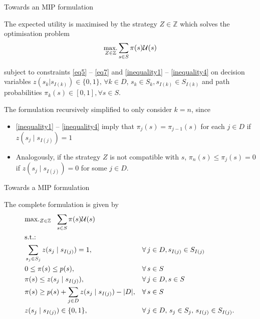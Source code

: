 \documentclass[mathserif,aspectratio=149]{beamer}
\begin{document}
\begin{frame}{Towards an MIP formulation}

\vspace{6pt}

\begin{corollary}\label{cor:opt1}
	The expected utility is maximised by the strategy $Z\in \mathbb{Z}$ which solves the optimisation problem  
	\vspace{-3pt}
	\begin{equation*}\label{optimization} \small
		\mathop{\text{max.}}_{Z \in \mathbb{Z}} \sum_{s \in S} \pi(s) \mathcal{U}(s)
	\end{equation*}
		
	subject to constraints \eqref{eq5} -- \eqref{eq7} and \eqref{inequality1} -- \eqref{inequality4} on decision variables $z(s_k|s_{I(k)}) \in \{0,1\}, \, \forall k \in D$, $s_k \in S_k, s_{I(k)} \in S_{I(k)}$ and path probabilities $\pi_k(s) \in [0,1], \forall s \in S$.    
\end{corollary}

\vspace{-6pt}
\pause	
The formulation \alert{recursively simplified} to only consider $k=n$, since
\vspace{-6pt}
\begin{itemize}
	\item \eqref{inequality1} -- \eqref{inequality4} imply that $\pi_j(s) = \pi_{j-1}(s)$ for each $j \in D$ if $z(s_j \mid s_{I(j)}) = 1$
	\item Analogously, if the strategy $Z$ is not compatible with $s$, $\pi_n(s) \leq \pi_j(s) = 0$ if $z(s_j \mid s_{I(j)}) = 0$ for some $j \in D$.
\end{itemize}
	
	
\end{frame}




\begin{frame}{Towards a MIP formulation}

The complete formulation is given by
%
{\small
\begin{align*}
& \text{max.}_{Z \in \mathbb{Z}} ~~  \sum_{s \in S} \pi(s) {\cal U}(s) \\
& \text{s.t.:}  \\
~~\, & \sum_{s_j \in S_j} z(s_j \mid s_{I(j)}) = 1, &&\forall \,j \in D, s_{I(j)} \in S_{I(j)} \\ 
& 0 \leq \pi(s) \leq p(s),  && \forall\, s \in S \\
& \pi(s) \leq z(s_j \mid s_{I(j)}), &&\forall\, j \in D , s\in S \\
& \pi(s) \geq p(s) + \sum_{j \in D} z(s_j \mid s_{I(j)}) - |D|,  &&\forall\, s \in S \\ 
& z(s_j \mid s_{I(j)}) \in \{0,1\}, &&\forall\, j \in D,\, s_j \in S_j, \, s_{I(j)} \in S_{I(j)}. 
\end{align*}
}
%
\end{frame}
\end{document}
